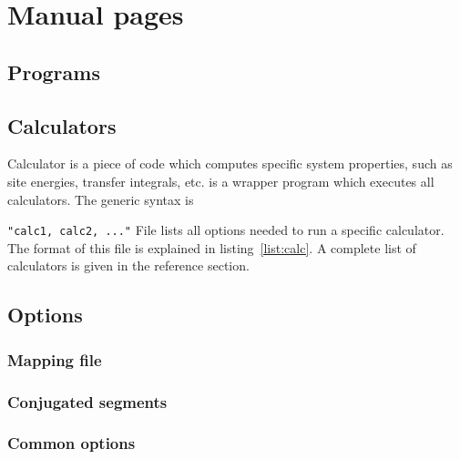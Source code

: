 \chapter{Manual pages}
%
%
\section{Programs}
\label{ref:programs}


\section{Calculators}
\label{ref:calculators}
\label{sec:calculators}

Calculator is a piece of code which computes specific system properties, such as site energies, transfer integrals, etc. \ctprun is a wrapper program which executes all calculators. The generic syntax is 

  \ctprun \exe \texttt{"calc1, calc2, ..."} \opt \xmloptions
\vskip 0.2cm
%
File \xmloptions lists all options needed to run a specific calculator. The format of this file is explained in listing~\ref{list:calc}. A complete list of calculators is given in the  reference section.
%



\vfill

\section{Options}
\label{ref:options}

\subsection{Mapping file}
{\small 

}
\vfill

\subsection{Conjugated segments}
{\small 

}
\vfill

\subsection{Common options}
{\small 

}
\vfill
